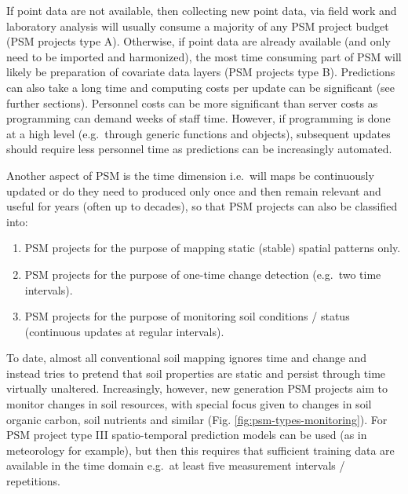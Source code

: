 \documentclass[graybox,natbib,nospthms,UStrade]{svmono}
\begin{document}
If point data are not available, then collecting new point data, via
field work and laboratory analysis will usually consume a majority of
any PSM project budget (PSM projects type A). Otherwise, if point data
are already available (and only need to be imported and harmonized), the
most time consuming part of PSM will likely be preparation of covariate
data layers (PSM projects type B). Predictions can also take a long time
and computing costs per update can be significant (see further sections).
Personnel costs can be more significant than server costs as programming
can demand weeks of staff time. However, if programming is done at a
high level (e.g.~through generic functions and objects), subsequent
updates should require less personnel time as predictions can be
increasingly automated.

Another aspect of PSM is the time dimension i.e.~will maps be
continuously updated or do they need to produced only once and then
remain relevant and useful for years (often up to decades), so that PSM
projects can also be classified into:

\begin{enumerate}
\def\labelenumi{\Roman{enumi}.}
\item
  PSM projects for the purpose of mapping static (stable) spatial
  patterns only.
\item
  PSM projects for the purpose of one-time change detection (e.g.~two
  time intervals).
\item
  PSM projects for the purpose of monitoring soil conditions / status
  (continuous updates at regular intervals).
\end{enumerate}

To date, almost all conventional soil mapping ignores time and change
and instead tries to pretend that soil properties are static and persist
through time virtually unaltered. Increasingly, however, new generation
PSM projects aim to monitor changes in soil resources, with special
focus given to changes in soil organic carbon, soil nutrients and
similar (Fig. \ref{fig:psm-types-monitoring}). For PSM project
type III spatio-temporal prediction models can
be used (as in meteorology for example), but then this requires that
sufficient training data are available in the time domain e.g.~at least
five measurement intervals / repetitions.
\end{document}

